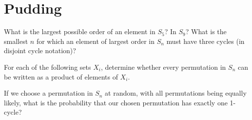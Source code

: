 \documentclass[answers]{exam}
\begin{document}
\section*{Pudding}
\begin{questions}

\question%
What is the largest possible order of an element in $S_{5}$? In $S_{9}$? What is the smallest $n$ for which an element of largest order in $S_{n}$ must have three cycles (in disjoint cycle notation)?



\question%
For each of the following sets $X_{i}$, determine whether every permutation in $S_{n}$ can be written as a product of elements of $X_{i}$.



\question%
If we choose a permutation in $S_{n}$ at random, with all permutations being equally likely, what is the probability that our chosen permutation has exactly one 1-cycle?

\end{questions}
\end{document}
